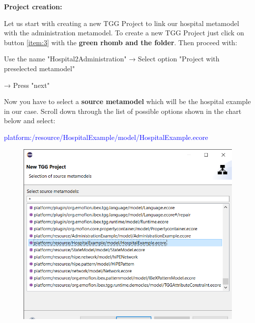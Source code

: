 \textbf{Project creation:}

Let us start with creating a new TGG Project to link our hospital metamodel with the administration metamodel. To create a new TGG Project just click on button \ref{item:3} with the \textbf{green rhomb and the folder}. Then proceed with:\newline

\centering

Use the name \textsf{"Hospital2Administration"} → Select option \textsf{"Project with preselected metamodel"}

→ Press \textsf{"next"}

\clearpage

\raggedright

Now you have to select a \textbf{source metamodel} which will be the hospital example in our case. Scroll down through the list of possible options shown in the chart below  and select:\newline

\centering

\textcolor{Blue}{\textsf{platform:/resource/HospitalExample/model/HospitalExample.ecore}}\newline

\raggedright

\begin{figure}[h]
    \centering
    \includegraphics[scale=0.5 ]{pictures/selectSourceModel.png}
    \caption{}
    \label{Source model selection}
\end{figure}

